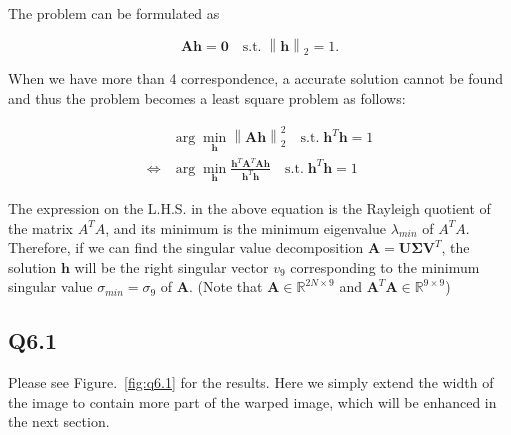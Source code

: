 \documentclass[11pt]{article}
\begin{document}
\newcommand{\norm}[1]{\left\lVert#1\right\rVert}

The problem can be formulated as

\begin{equation}
    \mathbf{Ah} = \mathbf{0} \quad
    \textrm{s.t.} \; \norm{\mathbf{h}}_2 = 1 .
\end{equation}

When we have more than 4 correspondence, a accurate solution cannot be found and thus the problem becomes a least square problem as follows:

\begin{align}
    & \arg\min_{\mathbf{h}} \norm{\mathbf{Ah}}^2_2
    \quad \textrm{s.t.} \; \mathbf{h}^T \mathbf{h} = 1
    \\ \Leftrightarrow
    & \arg\min_{\mathbf{h}}
    \frac{\mathbf{h}^T\mathbf{A}^T\mathbf{A}\mathbf{h}}{\mathbf{h}^T\mathbf{h}}
    \quad \textrm{s.t.} \; \mathbf{h}^T \mathbf{h} = 1
\end{align}

The expression on the L.H.S. in the above equation is the Rayleigh quotient of the matrix $A^T A$, and its minimum is the minimum eigenvalue $\lambda_{min}$ of $A^T A$. Therefore, if we can find the singular value decomposition $\mathbf{A} = \mathbf{U\Sigma V}^T$, the solution $\mathbf{h}$ will be the right singular vector $v_9$ corresponding to the minimum singular value $\sigma_{min}=\sigma_9$ of $\mathbf{A}$. (Note that $\mathbf{A}\in \mathbb{R}^{2N\times 9}$ and $\mathbf{A}^T\mathbf{A}\in \mathbb{R}^{9\times 9}$)

\newpage

\subsection*{Q6.1}

Please see Figure.~\ref{fig:q6.1} for the results. Here we simply extend the width of the image to contain more part of the warped image, which will be enhanced in the next section.
\end{document}
